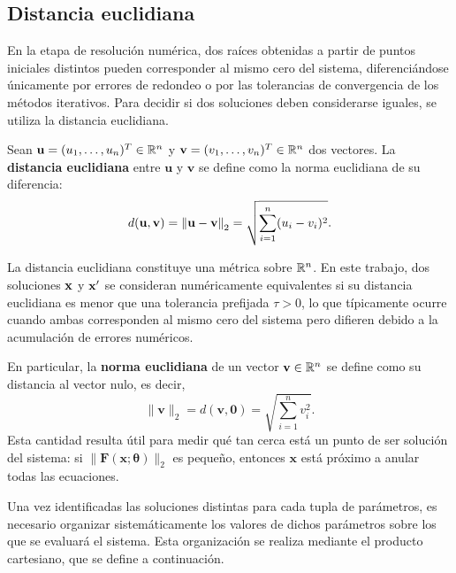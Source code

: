 \subsection{Distancia euclidiana}

En la etapa de resolución numérica, dos raíces obtenidas a partir de puntos iniciales distintos pueden corresponder al mismo cero del sistema, diferenciándose únicamente por errores de redondeo o por las tolerancias de convergencia de los métodos iterativos. Para decidir si dos soluciones deben considerarse iguales, se utiliza la distancia euclidiana.

\begin{definition} Sean \(\mathbf{u} = (u_1, \dots, u_n)^T \in \mathbb{R}^n\) y \(\mathbf{v} = (v_1, \dots, v_n)^T \in \mathbb{R}^n\) dos vectores. La \textbf{distancia euclidiana} entre \(\mathbf{u}\) y \(\mathbf{v}\) se define como la norma euclidiana de su diferencia: \begin{equation} d(\mathbf{u}, \mathbf{v}) = \left\lVert\mathbf{u} - \mathbf{v}\right\rVert_2 = \sqrt{\sum_{i=1}^{n} (u_i - v_i)^2}. \end{equation} \end{definition}

La distancia euclidiana constituye una métrica sobre \(\mathbb{R}^n\). En este trabajo, dos soluciones \(\mathbf{x}\) y \(\mathbf{x}'\) se consideran numéricamente equivalentes si su distancia euclidiana es menor que una tolerancia prefijada \(\tau > 0\), lo que típicamente ocurre cuando ambas corresponden al mismo cero del sistema pero difieren debido a la acumulación de errores numéricos.

En particular, la \textbf{norma euclidiana} de un vector \(\mathbf{v}\in\mathbb{R}^n\) se define como su distancia al vector nulo, es decir, \begin{equation} \|\mathbf{v}\|_2 = d(\mathbf{v}, \mathbf{0}) = \sqrt{\sum_{i=1}^{n} v_i^2}. \label{eq:norma_euclidiana} \end{equation} Esta cantidad resulta útil para medir qué tan cerca está un punto de ser solución del sistema: si \(\|\mathbf{F}(\mathbf{x}; \boldsymbol{\theta})\|_2\) es pequeño, entonces \(\mathbf{x}\) está próximo a anular todas las ecuaciones.

Una vez identificadas las soluciones distintas para cada tupla de parámetros, es necesario organizar sistemáticamente los valores de dichos parámetros sobre los que se evaluará el sistema. Esta organización se realiza mediante el producto cartesiano, que se define a continuación.

